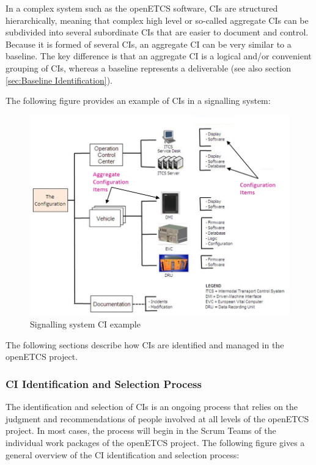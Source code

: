 \documentclass{template/openetcs_article}
\begin{document}
In a complex system such as the openETCS software, CIs are structured hierarchically, meaning that complex high level or so-called aggregate CIs can be subdivided into several subordinate CIs that are easier to document and control. Because it is formed of several CIs, an aggregate CI can be very similar to a baseline. The key difference is that an aggregate CI is a logical and/or convenient grouping of CIs, whereas a baseline represents a deliverable (see also section \ref{sec:Baseline Identification}).

The following figure provides an example of CIs in a signalling system:

\begin{figure}[H]
\centering
\caption{Signalling system CI example}
\includegraphics[scale=1.0]{./Figure/CI_Example.png}
\end{figure}

The following sections describe how CIs are identified and managed in the openETCS project.


\subsubsection{CI Identification and Selection Process} %
\label{sec:CI Identification and Selection Process}

The identification and selection of CIs is an ongoing process that relies on the judgment and recommendations of people involved at all levels of the openETCS project. In most cases, the process will begin in the Scrum Teams of the individual work packages of the openETCS project.
The following figure gives a general overview of the CI identification and selection process:
\end{document}
